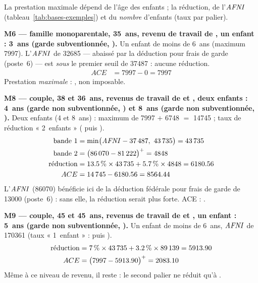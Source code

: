 \pexemples La prestation maximale dépend de l'âge des enfants ; la réduction, de
l'$\mathit{AFNI}$ (tableau~\ref{tab:bases-exemples}) et du \emph{nombre} d'enfants
(taux par palier).

\medskip\noindent\textbf{M6 --- famille monoparentale, 35~ans, revenu de travail de , un enfant : 3~ans (garde subventionnée, ).}
Un enfant de moins de 6~ans (maximum \num{7997}). L'$\mathit{AFNI}$ de
\num{32685} — abaissé par la déduction pour frais de garde (poste~6) — est
\emph{sous} le premier seuil de \num{37487} : aucune réduction.
\begin{align*}
ACE &= \num{7997} - 0 = \num{7997}
\end{align*}
Prestation \emph{maximale} : , non imposable.

\medskip\noindent\textbf{M8 --- couple, 38 et 36~ans, revenus de travail de  et , deux enfants : 4~ans (garde non subventionnée, ) et 8~ans (garde non subventionnée, ).}
Deux enfants (4 et 8~ans) : maximum de \num{7997} $+$
\num{6748} $=$ \num{14745} ; taux de réduction « 2~enfants »
( puis ).
\begin{align*}
\text{bande 1} &= \min\bigl(\mathit{AFNI} - \num{37487},\ \num{43735}\bigr) = \num{43735} \\
\text{bande 2} &= \bigl(\num{86070} - \num{81222}\bigr)^{+} = \num{4848} \\
\text{réduction} &= \num{13.5}\,\% \times \num{43735} + \num{5.7}\,\% \times \num{4848} = \num{6180.56} \\
ACE &= \num{14745} - \num{6180.56} = \num{8564.44}
\end{align*}
L'$\mathit{AFNI}$ (\num{86070}) bénéficie ici de la déduction fédérale pour frais
de garde de \num{13000} (poste~6) : sans elle, la réduction serait plus
forte. ACE : .

\medskip\noindent\textbf{M9 --- couple, 45 et 45~ans, revenus de travail de  et , un enfant : 5~ans (garde non subventionnée, ).}
Un enfant de moins de 6~ans, $\mathit{AFNI}$ de \num{170361} (taux
« 1~enfant » :  puis ).
\begin{align*}
\text{réduction} &= \num{7}\,\% \times \num{43735} + \num{3.2}\,\% \times \num{89139} = \num{5913.90} \\
ACE &= \bigl(\num{7997} - \num{5913.90}\bigr)^{+} = \num{2083.10}
\end{align*}
Même à ce niveau de revenu, il reste  : le second palier ne
réduit qu'à .
